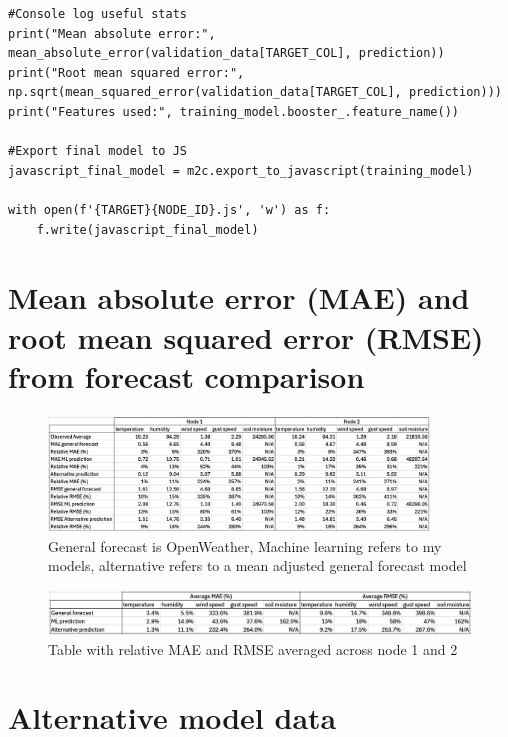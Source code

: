 \begin{multicols}{2}
\begin{lstlisting}
#Console log useful stats
print("Mean absolute error:", mean_absolute_error(validation_data[TARGET_COL], prediction))
print("Root mean squared error:", np.sqrt(mean_squared_error(validation_data[TARGET_COL], prediction)))
print("Features used:", training_model.booster_.feature_name())

#Export final model to JS
javascript_final_model = m2c.export_to_javascript(training_model)

with open(f'{TARGET}{NODE_ID}.js', 'w') as f:
    f.write(javascript_final_model)

    \end{lstlisting}
\end{multicols}

\section{Mean absolute error (MAE) and root mean squared error (RMSE) from
forecast comparison}\label{app:ml-stats}

\begin{figure}[H]
    \centering
    \includegraphics[width=0.9\textwidth]{contents/appendix/fig5/mae-rmse.png}
    \caption{General forecast is OpenWeather, Machine learning refers to my models, alternative refers to a mean adjusted general forecast model}
    \label{fig:mae-rmse}
\end{figure}

\begin{figure}[H]
    \centering
    \includegraphics[width=1\textwidth]{contents/appendix/fig5/rel-mae-rmse.png}
    \caption{Table with relative MAE and RMSE averaged across node 1 and 2}
    \label{fig:rel-mae-rmse}
\end{figure}

\section{Alternative model data}\label{app:alt-data}

